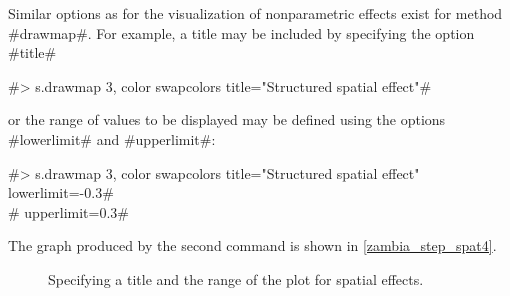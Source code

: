 \documentclass[11pt,a4paper,twoside]{bayesxreport}
\begin{document}
Similar options as for the visualization of nonparametric effects
exist for method #drawmap#. For example, a title may be included by
specifying the option #title#

#> s.drawmap 3, color swapcolors title="Structured spatial effect"#

or the range of values to be displayed may be defined using the
options #lowerlimit# and #upperlimit#:

#> s.drawmap 3, color swapcolors title="Structured spatial effect" lowerlimit=-0.3#\\
#  upperlimit=0.3#

The graph produced by the second command is shown in
\autoref{zambia_step_spat4}.

\begin{figure}[ht]
\begin{center}
{\it\caption{Specifying a title and the range of the plot for
spatial effects.\label{zambia_step_spat4}}}
\end{center}
\end{figure}


%
\end{document}
